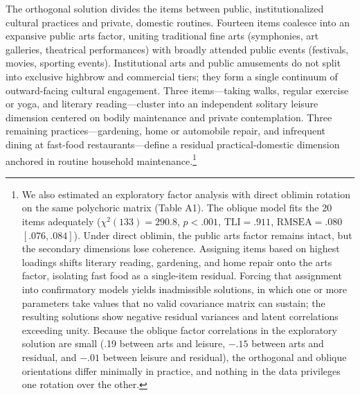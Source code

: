 \documentclass[
  12pt
]{article}
\begin{document}
The orthogonal solution divides the items between public, institutionalized cultural practices and private, domestic routines. Fourteen items coalesce into an expansive public arts factor, uniting traditional fine arts (symphonies, art galleries, theatrical performances) with broadly attended public events (festivals, movies, sporting events). Institutional arts and public amusements do not split into exclusive highbrow and commercial tiers; they form a single continuum of outward-facing cultural engagement. Three items---taking walks, regular exercise or yoga, and literary reading---cluster into an independent solitary leisure dimension centered on bodily maintenance and private contemplation. Three remaining practices---gardening, home or automobile repair, and infrequent dining at fast-food restaurants---define a residual practical-domestic dimension anchored in routine household maintenance.\footnote{We also estimated an exploratory factor analysis with direct oblimin rotation on the same polychoric matrix (Table A1). The oblique model fits the 20 items adequately ($\chi^2(133) = 290.8$, $p < .001$, $\text{TLI} = .911$, $\text{RMSEA} = .080$ $[.076, .084]$). Under direct oblimin, the public arts factor remains intact, but the secondary dimensions lose coherence. Assigning items based on highest loadings shifts literary reading, gardening, and home repair onto the arts factor, isolating fast food as a single-item residual. Forcing that assignment into confirmatory models yields inadmissible solutions, in which one or more parameters take values that no valid covariance matrix can sustain; the resulting solutions show negative residual variances and latent correlations exceeding unity. Because the oblique factor correlations in the exploratory solution are small (.19 between arts and leisure, $-.15$ between arts and residual, and $-.01$ between leisure and residual), the orthogonal and oblique orientations differ minimally in practice, and nothing in the data privileges one rotation over the other.}
\end{document}
